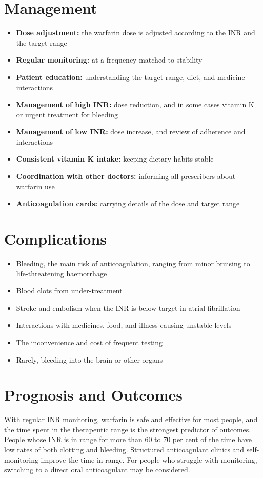\section*{Management}
\begin{itemize}
    \item \textbf{Dose adjustment:} the warfarin dose is adjusted according to the INR and the target range
    \item \textbf{Regular monitoring:} at a frequency matched to stability
    \item \textbf{Patient education:} understanding the target range, diet, and medicine interactions
    \item \textbf{Management of high INR:} dose reduction, and in some cases vitamin K or urgent treatment for bleeding
    \item \textbf{Management of low INR:} dose increase, and review of adherence and interactions
    \item \textbf{Consistent vitamin K intake:} keeping dietary habits stable
    \item \textbf{Coordination with other doctors:} informing all prescribers about warfarin use
    \item \textbf{Anticoagulation cards:} carrying details of the dose and target range
\end{itemize}

\section*{Complications}
\begin{itemize}
    \item Bleeding, the main risk of anticoagulation, ranging from minor bruising to life-threatening haemorrhage
    \item Blood clots from under-treatment
    \item Stroke and embolism when the INR is below target in atrial fibrillation
    \item Interactions with medicines, food, and illness causing unstable levels
    \item The inconvenience and cost of frequent testing
    \item Rarely, bleeding into the brain or other organs
\end{itemize}

\section*{Prognosis and Outcomes}
With regular INR monitoring, warfarin is safe and effective for most people, and the time spent in the therapeutic range is the strongest predictor of outcomes. People whose INR is in range for more than 60 to 70 per cent of the time have low rates of both clotting and bleeding. Structured anticoagulant clinics and self-monitoring improve the time in range. For people who struggle with monitoring, switching to a direct oral anticoagulant may be considered.

